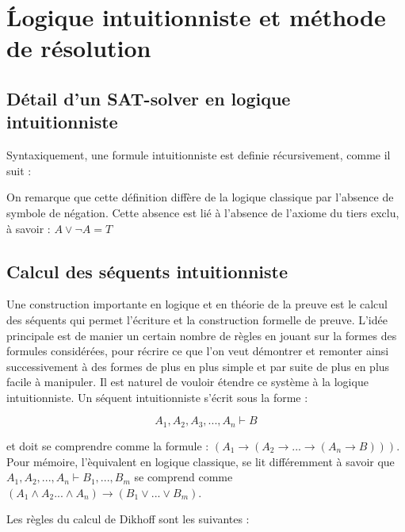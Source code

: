 \section{\'Logique intuitionniste et m\'ethode de r\'esolution}

\subsection{D\'etail d'un SAT-solver en logique intuitionniste}
Syntaxiquement, une formule intuitionniste est definie récursivement, comme il suit :


On remarque que cette d\'efinition diff\`ere de la logique classique par l'absence de symbole de n\'egation. Cette absence est li\'e \`a l'absence de l'axiome du tiers exclu, \`a savoir : $A \lor \neg A = T$ 

\subsection{Calcul des séquents intuitionniste}

Une construction importante en logique et en th\'eorie de la preuve est le calcul des s\'equents qui permet l'\'ecriture et la construction formelle de preuve. L'id\'ee principale est de manier un certain nombre de r\`egles en jouant sur la formes des formules consid\'er\'ees, pour r\'ecrire ce que l'on veut d\'emontrer et remonter ainsi successivement \`a des formes de plus en plus simple et par suite de plus en plus facile \`a manipuler. Il est naturel de vouloir \'etendre ce syst\`eme \`a la logique intuitionniste.
Un s\'equent intuitionniste s'\'ecrit sous la forme :

$$A_1, A_2, A_3, ..., A_n \vdash B$$

et doit se comprendre comme la formule : $(A_1 \to (A_2 \to ... \to (A_n \to B)))$. Pour m\'emoire, l'\`equivalent en logique classique, se lit diff\'eremment à savoir que $A_1, A_2, ..., A_n \vdash B_1, ..., B_m$ se comprend comme $(A_1 \land A_2 ... \land A_n) \to (B_1 \lor ... \lor B_m)$.

Les r\`egles du calcul de Dikhoff sont les suivantes :

